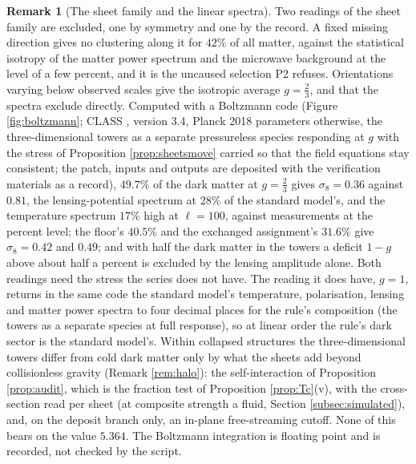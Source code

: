 \documentclass[11pt]{article}
\theoremstyle{definition}
\newtheorem{remark}[theorem]{Remark}
\begin{document}
\begin{remark}[The sheet family and the linear spectra]\label{rem:isotropy}
Two readings of the sheet family are excluded, one by symmetry and one by the record. A fixed missing direction gives no clustering along it for $42\%$ of all matter, against the statistical isotropy of the matter power spectrum and the microwave background at the level of a few percent, and it is the uncaused selection P2 refuses. Orientations varying below observed scales give the isotropic average $g = \tfrac{2}{3}$, and that the spectra exclude directly. Computed with a Boltzmann code (Figure \ref{fig:boltzmann}; CLASS \cite{CLASS2011}, version 3.4, Planck 2018 parameters otherwise, the three-dimensional towers as a separate pressureless species responding at $g$ with the stress of Proposition \ref{prop:sheetsmove} carried so that the field equations stay consistent; the patch, inputs and outputs are deposited with the verification materials as a record), $49.7\%$ of the dark matter at $g = \tfrac{2}{3}$ gives $\sigma_{8} = 0.36$ against $0.81$, the lensing-potential spectrum at $28\%$ of the standard model's, and the temperature spectrum $17\%$ high at $\ell = 100$, against measurements at the percent level; the floor's $40.5\%$ and the exchanged assignment's $31.6\%$ give $\sigma_{8} = 0.42$ and $0.49$; and with half the dark matter in the towers a deficit $1 - g$ above about half a percent is excluded by the lensing amplitude alone. Both readings need the stress the series does not have. The reading it does have, $g = 1$, returns in the same code the standard model's temperature, polarisation, lensing and matter power spectra to four decimal places for the rule's composition (the towers as a separate species at full response), so at linear order the rule's dark sector is the standard model's. Within collapsed structures the three-dimensional towers differ from cold dark matter only by what the sheets add beyond collisionless gravity (Remark \ref{rem:halo}): the self-interaction of Proposition \ref{prop:audit}, which is the fraction test of Proposition \ref{prop:Tc}(v), with the cross-section read per sheet (at composite strength a fluid, Section \ref{subsec:simulated}), and, on the deposit branch only, an in-plane free-streaming cutoff. None of this bears on the value $5.364$. The Boltzmann integration is floating point and is recorded, not checked by the script.
\end{remark}
\end{document}
